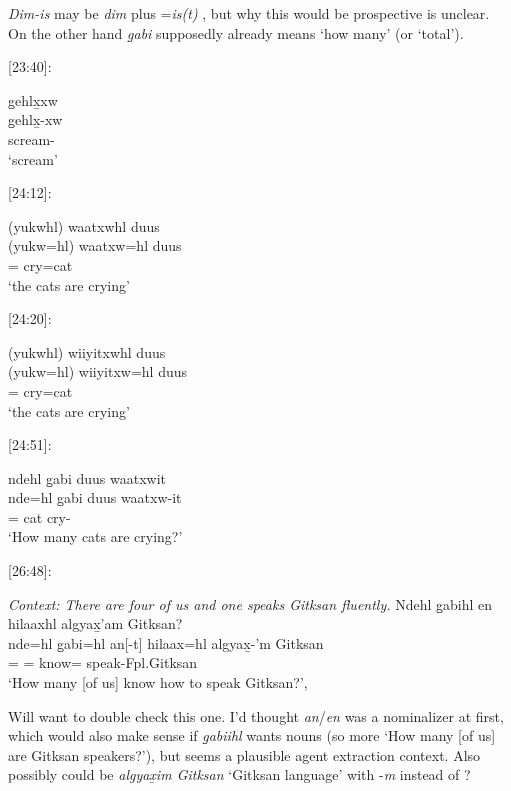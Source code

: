 \textit{Dim-is} may be \textit{dim} \Prosp{} plus =\textit{is(t)} \Qudd{}, but why this would be prospective is unclear. On the other hand \textit{g̱abi} supposedly already means `how many' (or `total').

[23:40]: 
\begin{exe}
    \ex \glll 
    g̱ehlx̱xw \\ 
    g̱ehlx̱-xw \\
    scream-\Val \\
    \glt `scream'
\end{exe}

[24:12]: 
\begin{exe}
    \ex \glll 
    (yukwhl) waatxwhl duus \\ 
    (yukw=hl) waatxw=hl duus \\ 
    \Prog=\Cn{} cry=\Cn cat \\
    \glt `the cats are crying'
\end{exe}

[24:20]: 
\begin{exe}
    \ex \glll 
    (yukwhl) wiiyitxwhl duus \\ 
    (yukw=hl) wiiyitxw=hl duus \\
    \Prog=\Cn{} cry=\Cn cat \\
    \glt `the cats are crying'
\end{exe}

[24:51]: 
\begin{exe}
    \ex \glll
    ndehl g̱abi duus waatxwit \\
    nde=hl g̱abi duus waatxw-it \\
    \Wh=\Cn{} \Cnt cat cry-\Sx{} \\
    \glt `How many cats are crying?'
\end{exe}

[26:48]: 
\begin{exe}
    \ex \textit{Context: There are four of us and one speaks Gitksan fluently.} \glll
    Ndehl g̱abihl en hilaaxhl algyax̱'am Gitksan? \\
    nde=hl g̱abi=hl an[-t] hilaax=hl algyax̱-'m Gitksan \\
    \Wh=\Cn{} \Cnt=\Cn{} \Ax[-3.\I] know=\Cn{} speak-Fpl.\Ii Gitksan \\
    \glt `How many [of us] know how to speak Gitksan?',
\end{exe}

Will want to double check this one. I'd thought \textit{an}/\textit{en} was a nominalizer at first, which would also make sense if \textit{g̱abiihl} wants nouns (so more `How many [of us] are Gitksan speakers?'), but seems a plausible agent extraction context. Also possibly could be \textit{algyax̱im Gitksan} `Gitksan language' with -\textit{m} \Attr{} instead of \Fpl{}?

